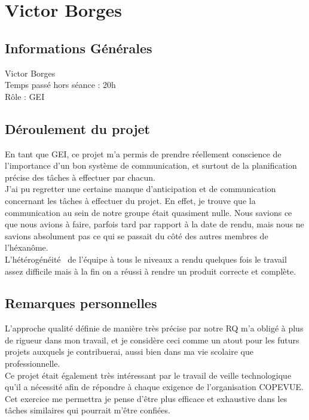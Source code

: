 \section{Victor Borges}

\subsection{Informations Générales}

Victor Borges \\
Temps passé hors séance : 20h \\
Rôle : GEI

\subsection{Déroulement du projet}

En tant que GEI, ce projet m’a permis de prendre réellement conscience de l’importance d’un bon système de communication, et surtout de la planification précise des tâches à effectuer par chacun. \\

J’ai pu regretter une certaine manque d’anticipation et de communication concernant les tâches à effectuer du projet. En effet, je trouve que la communication au sein de notre groupe était quasiment nulle. Nous savions ce que nous avions à faire, parfois tard par rapport à la date de rendu, mais nous ne savions absolument pas ce qui se passait du côté des autres membres de l’héxanôme. \\

L’hétérogénéité  de l’équipe à tous le niveaux a rendu quelques fois le travail assez difficile mais à la fin on a réussi à rendre un produit correcte et complète.

\subsection{Remarques personnelles}

L’approche qualité définie de manière très précise par notre RQ m’a obligé à plus de rigueur dans mon travail, et je considère ceci comme un atout pour les futurs projets auxquels je contribuerai, aussi bien dans ma vie scolaire que professionnelle. \\

Ce projet était également très intéressant par le travail de veille technologique qu’il a nécessité afin de répondre à chaque exigence de l’organisation COPEVUE. Cet exercice me permettra je pense d’être plus efficace et exhaustive dans les tâches similaires qui pourrait m’être confiées.


